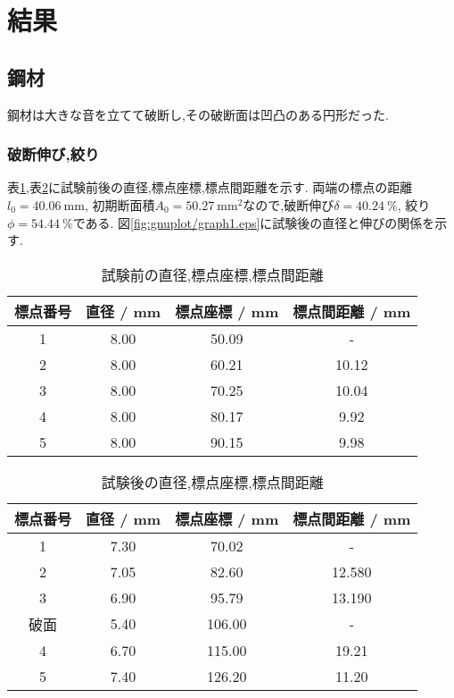 \section{結果}
\subsection{鋼材}
鋼材は大きな音を立てて破断し,その破断面は凹凸のある円形だった.
\subsubsection{破断伸び,絞り}
表\ref{tab:res_steel_pre},表\ref{tab:res_steel_nex}に試験前後の直径,標点座標,標点間距離を示す.
両端の標点の距離$l_0=40.06~\si{\milli\metre}$, 初期断面積$A_0=50.27~\si{\milli\metre^2}$なので,破断伸び$\delta=40.24~\%$, 絞り$\phi=54.44~\%$である.
図\ref{fig:gnuplot/graph1.eps}に試験後の直径と伸びの関係を示す.
\begin{table}[htbp]
  \begin{center}
    \caption{試験前の直径,標点座標,標点間距離}
    \label{tab:res_steel_pre}
    \begin{tabular}{cccc}
      \hline
      標点番号&直径 / mm&標点座標 / mm&標点間距離 / mm\\
      \hline \hline
      1 & 8.00 & 50.09 & - \\
  2 & 8.00 & 60.21 & 10.12 \\
  3 & 8.00 & 70.25 & 10.04 \\
  4 & 8.00 & 80.17 & 9.92 \\
  5 & 8.00 & 90.15 & 9.98 \\
      \hline
    \end{tabular}
  \end{center}
\end{table}
\begin{table}[htbp]
  \begin{center}
    \caption{試験後の直径,標点座標,標点間距離}
    \label{tab:res_steel_nex}
  \begin{tabular}{cccc}
    \hline
    標点番号&直径 / mm&標点座標 / mm&標点間距離 / mm\\
    \hline \hline
    1 & 7.30 & 70.02 & - \\
2 & 7.05 & 82.60 & 12.580  \\
3 & 6.90 & 95.79 & 13.190  \\
破面 & 5.40 & 106.00 & - \\
4 & 6.70 & 115.00 & 19.21  \\
5 & 7.40 & 126.20 & 11.20  \\
    \hline
  \end{tabular}
\end{center}
\end{table}
